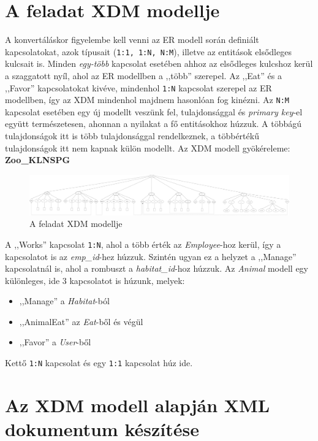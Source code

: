 \documentclass[12pt]{report}
\begin{document}
\section[XDM modell]{A feladat XDM modellje}

\indent\indent A konvertáláskor figyelembe kell venni az ER modell során definiált kapcsolatokat, azok típusait (\texttt{1:1, 1:N, N:M}), illetve az entitások elsődleges kulcsait is. Minden \textit{egy-több} kapcsolat esetében ahhoz az elsődleges kulcshoz kerül a szaggatott nyíl, ahol az ER modellben a ,,több'' szerepel. Az ,,Eat'' és a ,,Favor'' kapcsolatokat kivéve, mindenhol \texttt{1:N} kapcsolat szerepel az ER modellben, így az XDM mindenhol majdnem hasonlóan fog kinézni. Az \texttt{N:M} kapcsolat esetében egy új modellt veszünk fel, tulajdonsággal és \textit{primary key}-el együtt természetesen, ahonnan a nyilakat a fő entitásokhoz húzzuk. A többágú tulajdonságok itt is több tulajdonsággal rendelkeznek, a többértékű tulajdonságok itt nem kapnak külön modellt. Az XDM modell gyökéreleme: \textbf{Zoo\_KLNSPG}

\begin{figure}[h]
	\centering
	\includegraphics[width=1.01\linewidth]{XDMKLNSPG.png}
	\caption{A feladat XDM modellje}
\end{figure}

A ,,Works'' kapcsolat \texttt{1:N}, ahol a több érték az \textit{Employee}-hoz kerül, így a kapcsolatot is az \textit{emp\_id}-hez húzzuk. Szintén ugyan ez a helyzet a ,,Manage'' kapcsolatnál is, ahol a rombuszt a \textit{habitat\_id}-hoz húzzuk. Az \textit{Animal} modell egy különleges, ide 3 kapcsolatot is húzunk, melyek:

\begin{itemize}
	\item ,,Manage'' a \textit{Habitat}-ból
	\item ,,AnimalEat'' az \textit{Eat}-ből és végül
	\item ,,Favor'' a \textit{User}-ből 
\end{itemize}
Kettő \texttt{1:N} kapcsolat és egy \texttt{1:1} kapcsolat húz ide.

\section{Az XDM modell alapján XML dokumentum készítése}
\end{document}

